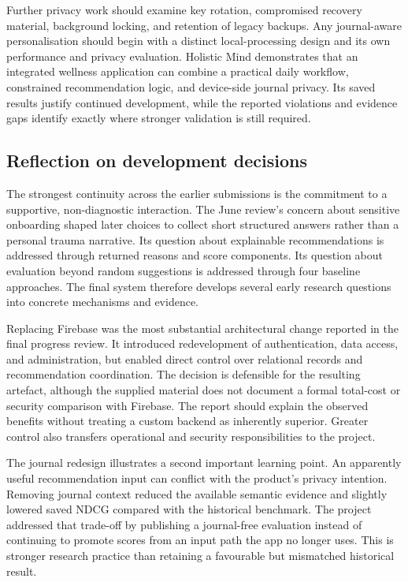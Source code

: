 Further privacy work should examine key rotation, compromised recovery material, background locking, and retention of legacy backups. Any journal-aware personalisation should begin with a distinct local-processing design and its own performance and privacy evaluation. Holistic Mind demonstrates that an integrated wellness application can combine a practical daily workflow, constrained recommendation logic, and device-side journal privacy. Its saved results justify continued development, while the reported violations and evidence gaps identify exactly where stronger validation is still required.

\subsection{Reflection on development decisions}

The strongest continuity across the earlier submissions is the commitment to a supportive, non-diagnostic interaction. The June review's concern about sensitive onboarding shaped later choices to collect short structured answers rather than a personal trauma narrative. Its question about explainable recommendations is addressed through returned reasons and score components. Its question about evaluation beyond random suggestions is addressed through four baseline approaches. The final system therefore develops several early research questions into concrete mechanisms and evidence.

Replacing Firebase was the most substantial architectural change reported in the final progress review. It introduced redevelopment of authentication, data access, and administration, but enabled direct control over relational records and recommendation coordination. The decision is defensible for the resulting artefact, although the supplied material does not document a formal total-cost or security comparison with Firebase. The report should explain the observed benefits without treating a custom backend as inherently superior. Greater control also transfers operational and security responsibilities to the project.

The journal redesign illustrates a second important learning point. An apparently useful recommendation input can conflict with the product's privacy intention. Removing journal context reduced the available semantic evidence and slightly lowered saved NDCG compared with the historical benchmark. The project addressed that trade-off by publishing a journal-free evaluation instead of continuing to promote scores from an input path the app no longer uses. This is stronger research practice than retaining a favourable but mismatched historical result.


